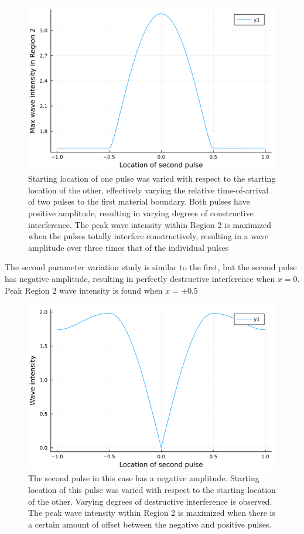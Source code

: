 \documentclass[twocolumn, letterpaper]{article}
\begin{document}
\begin{figure}
\includegraphics[width=\columnwidth]{PulseSpacing}
\caption{Starting location of one pulse was varied with respect to the starting location of the other, effectively varying the relative time-of-arrival of two pulses to the first material boundary. Both pulses have positive amplitude, resulting in varying degrees of constructive interference. The peak wave intensity within Region 2  is maximized when the pulses totally interfere constructively, resulting in a wave amplitude over three times that of the individual pulses }
\label{fig:study1}
\end{figure}

The second parameter variation study is similar to the first, but the second pulse has negative amplitude, resulting in perfectly destructive interference when $x=0$. Peak Region 2 wave intensity is found when $x=\pm 0.5$

\begin{figure}
\includegraphics[width=\columnwidth]{PulseSpacingReverse}
\caption{The second pulse in this case has a negative amplitude. Starting location of this pulse was varied with respect to the starting location of the other. Varying degrees of destructive interference is observed. The peak wave intensity within Region 2  is maximized when there is a certain amount of offset between the negative and positive pulses.}
\label{fig:study2}
\end{figure}
\end{document}
